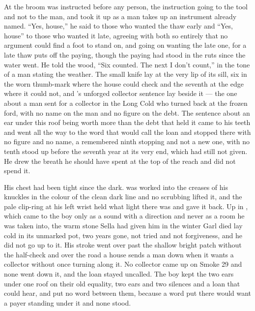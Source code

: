 \scenebreak

At  the broom was instructed before any person, the instruction going to the tool and not to the man, and  took it up as a man takes up an instrument already named. “Yes, house,” he said to those who wanted the thaw early and “Yes, house” to those who wanted it late, agreeing with both so entirely that no argument could find a foot to stand on, and going on wanting the late one, for a late thaw puts off the paying, though the paying had stood in the ruts since the water went. He told the wood, “Six counted. The next I don't count,” in the tone of a man stating the weather. The small knife lay at the very lip of its sill, six in the worn thumb-mark where the house could check and the seventh at the edge where it could not, and 's unforged collector sentence lay beside it --- the one about a man sent for a collector in the Long Cold who turned back at the frozen ford, with no name on the man and no figure on the debt. The sentence about an ear under this roof being worth more than the debt that held it came to his teeth and went all the way to the word that would call the loan and stopped there with no figure and no name, a remembered ninth stopping and not a new one, with no tenth stood up before the seventh year at its very end, which had still not given. He drew the breath he should have spent at the top of the reach and did not spend it.

His chest had been tight since the dark.  was worked into the creases of his knuckles in the colour of the clean dark line and no scrubbing lifted it, and the pale clip-ring at his left wrist held what light there was and gave it back. Up in , which came to the boy only as a sound with a direction and never as a room he was taken into, the warm stone Sella had given him in the winter Garl died lay cold in its unmarked pot, two years gone, not tried and not forgiveness, and he did not go up to it. His stroke went over  past the shallow bright patch without the half-check and over the road a house sends a man down when it wants a collector without once turning along it. No collector came up  on Smoke 29 and none went down it, and the loan stayed uncalled. The boy kept the two ears under one roof on their old equality, two ears and two silences and a loan that could hear, and put no word between them, because a word put there would want a payer standing under it and none stood.

